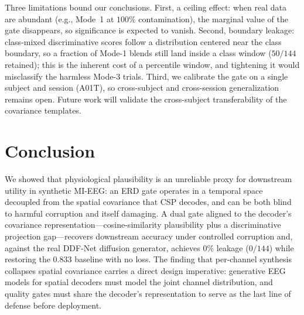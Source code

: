 \documentclass[conference]{IEEEtran}
\begin{document}
Three limitations bound our conclusions. First, a ceiling effect: when real data
are abundant (e.g., Mode~1 at $100\%$ contamination), the marginal value of the
gate disappears, so significance is expected to vanish. Second, boundary leakage:
class-mixed discriminative scores follow a distribution centered near the class
boundary, so a fraction of Mode-1 blends still land inside a class window
($50/144$ retained); this is the inherent cost of a percentile window, and
tightening it would misclassify the harmless Mode-3 trials. Third, we calibrate
the gate on a single subject and session (A01T), so cross-subject and
cross-session generalization remains open. Future work will validate the
cross-subject transferability of the covariance templates.

\section{Conclusion}
\label{sec:conclusion}

We showed that physiological plausibility is an unreliable proxy for
downstream utility in synthetic MI-EEG: an ERD gate operates in a temporal space
decoupled from the spatial covariance that CSP decodes, and can be both blind to
harmful corruption and itself damaging. A dual gate aligned to the decoder's
covariance representation---cosine-similarity plausibility plus a
discriminative projection gap---recovers downstream accuracy under controlled
corruption and, against the real DDF-Net diffusion generator, achieves $0\%$
leakage ($0/144$) while restoring the $0.833$ baseline with no loss. The finding
that per-channel synthesis collapses spatial covariance carries a direct design
imperative: generative EEG models for spatial decoders must model the joint
channel distribution, and quality gates must share the decoder's representation
to serve as the last line of defense before deployment.



\end{document}
